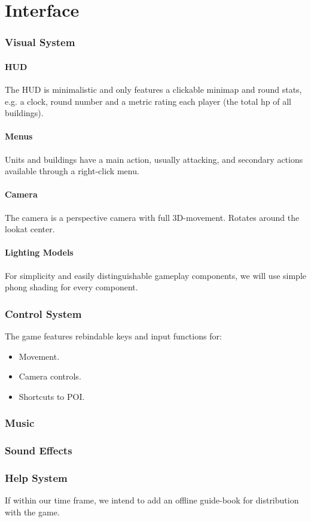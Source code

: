 \part{Interface}
\section{Visual System}
\subsection{HUD}
The HUD is minimalistic and only features a clickable minimap and round stats, e.g.
a clock, round number and a metric rating each player (the total hp of all buildings).
\subsection{Menus}
Units and buildings have a main action, usually attacking, and secondary actions available
through a right-click menu.
\subsection{Camera}
The camera is a perspective camera with full 3D-movement. Rotates around the lookat center.
\subsection{Lighting Models}
For simplicity and easily distinguishable gameplay components, we will use simple phong shading
for every component.
\section{Control System}
The game features rebindable keys and input functions for:

\begin{itemize}
    \item Movement.
    \item Camera controls.
    \item Shortcuts to POI.
\end{itemize}
\section{Music} %
\section{Sound Effects} %
\section{Help System} %
If within our time frame, we intend to add an offline guide-book for distribution with the game.
